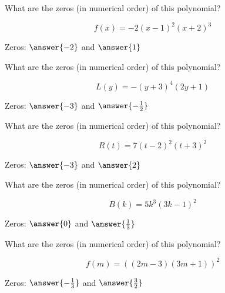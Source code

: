 \documentclass{ximera}
\author{Lee Wayand}
\begin{document}
\begin{example}








\begin{question}


What are the zeros (in numerical order) of this polynomial?

\[
f(x) = -2(x-1)^2(x+2)^3
\]


Zeros:  $\answer{-2}$ and $\answer{1}$

\end{question}





\begin{question}


What are the zeros (in numerical order) of this polynomial?

\[
L(y) = -(y+3)^4(2y+1)
\]

Zeros:  $\answer{-3}$ and $\answer{-\frac{1}{2}}$

\end{question}





\begin{question}


What are the zeros (in numerical order) of this polynomial?

\[
R(t) = 7(t-2)^2(t+3)^2
\]

Zeros:  $\answer{-3}$ and $\answer{2}$

\end{question}





\begin{question}


What are the zeros (in numerical order) of this polynomial?

\[
B(k) =  5k^3 (3k - 1)^2
\]

Zeros:  $\answer{0}$ and $\answer{\frac{1}{3}}$

\end{question}








\begin{question}


What are the zeros (in numerical order) of this polynomial?

\[
f(m) = ((2m - 3)(3m + 1))^2
\]

Zeros:  $\answer{-\frac{1}{3}}$ and $\answer{\frac{3}{2}}$

\end{question}












\end{example}
\end{document}
